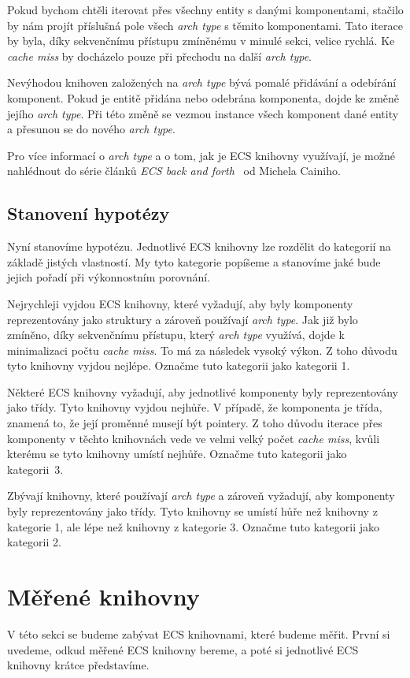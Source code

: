 Pokud bychom chtěli iterovat přes všechny entity s danými komponentami, stačilo by nám projít příslušná pole všech \textit{arch type} s těmito komponentami. Tato iterace by byla, díky sekvenčnímu přístupu zmíněnému v minulé sekci, velice rychlá. Ke \textit{cache miss} by docházelo pouze při přechodu na další \textit{arch type}.

Nevýhodou knihoven založených na \textit{arch type} bývá pomalé přidávání a odebírání komponent. Pokud je entitě přidána nebo odebrána komponenta, dojde ke změně jejího \textit{arch type}. Při této změně se vezmou instance všech komponent dané entity a přesunou se do nového \textit{arch type}.

Pro více informací o \textit{arch type} a o tom, jak je ECS knihovny využívají, je možné nahlédnout do série článků \textit{ECS back and forth}~\cite{Caini_2019} od Michela Cainiho.

\subsection{Stanovení hypotézy}
\label{hypothesis}
Nyní stanovíme hypotézu. Jednotlivé ECS knihovny lze rozdělit do kategorií na základě jistých vlastností. My tyto kategorie popíšeme a stanovíme jaké bude jejich pořadí při výkonnostním porovnání.

Nejrychleji vyjdou ECS knihovny, které vyžadují, aby byly komponenty reprezentovány jako struktury a zároveň používají \textit{arch type}. Jak již bylo zmíněno, díky sekvenčnímu přístupu, který \textit{arch type} využívá, dojde k minimalizaci počtu \textit{cache miss}. To má za následek vysoký výkon. Z toho důvodu tyto knihovny vyjdou nejlépe. Označme tuto kategorii jako kategorii 1.

Některé ECS knihovny vyžadují, aby jednotlivé komponenty byly reprezentovány jako třídy. Tyto knihovny vyjdou nejhůře. V případě, že komponenta je třída, znamená to, že její proměnné musejí být pointery. Z toho důvodu iterace přes komponenty v těchto knihovnách vede ve velmi velký počet \textit{cache miss}, kvůli kterému se tyto knihovny umístí nejhůře. Označme tuto kategorii jako kategorii~3.

Zbývají knihovny, které používají \textit{arch type} a zároveň vyžadují, aby komponenty byly reprezentovány jako třídy. Tyto knihovny se umístí hůře než knihovny z kategorie 1, ale lépe než knihovny z kategorie 3. Označme tuto kategorii jako kategorii 2.

\section{Měřené knihovny}
V této sekci se budeme zabývat ECS knihovnami, které budeme měřit. První si uvedeme, odkud měřené ECS knihovny bereme, a poté si jednotlivé ECS knihovny krátce představíme.

